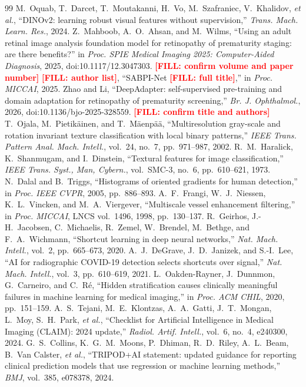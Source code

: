 \documentclass[journal]{IEEEtran}
\newcommand{\FILL}[1]{\textcolor{red}{\textbf{[FILL: #1]}}}
\begin{document}
\begin{thebibliography}{99}
 M.~Oquab, T.~Darcet, T.~Moutakanni, H.~Vo, M.~Szafraniec, V.~Khalidov, \emph{et al.}, ``DINOv2: learning robust visual features without supervision,'' \emph{Trans. Mach. Learn. Res.}, 2024.
 Z.~Mahboob, A.~O.~Ahsan, and M.~Wilms, ``Using an adult retinal image analysis foundation model for retinopathy of prematurity staging: are there benefits?'' in \emph{Proc. SPIE Medical Imaging 2025: Computer-Aided Diagnosis}, 2025, doi:10.1117/12.3047303. \FILL{confirm volume and paper number}
 \FILL{author list}, ``SABPI-Net \FILL{full title},'' in \emph{Proc. MICCAI}, 2025.
 Zhao and Li, ``DeepAdapter: self-supervised pre-training and domain adaptation for retinopathy of prematurity screening,'' \emph{Br. J. Ophthalmol.}, 2026, doi:10.1136/bjo-2025-328559. \FILL{confirm title and authors}
 T.~Ojala, M.~Pietik\"ainen, and T.~M\"aenp\"a\"a, ``Multiresolution gray-scale and rotation invariant texture classification with local binary patterns,'' \emph{IEEE Trans. Pattern Anal. Mach. Intell.}, vol.~24, no.~7, pp.~971--987, 2002.
 R.~M.~Haralick, K.~Shanmugam, and I.~Dinstein, ``Textural features for image classification,'' \emph{IEEE Trans. Syst., Man, Cybern.}, vol.~SMC-3, no.~6, pp.~610--621, 1973.
 N.~Dalal and B.~Triggs, ``Histograms of oriented gradients for human detection,'' in \emph{Proc. IEEE CVPR}, 2005, pp.~886--893.
 A.~F.~Frangi, W.~J.~Niessen, K.~L.~Vincken, and M.~A.~Viergever, ``Multiscale vessel enhancement filtering,'' in \emph{Proc. MICCAI}, LNCS vol.~1496, 1998, pp.~130--137.
 R.~Geirhos, J.-H.~Jacobsen, C.~Michaelis, R.~Zemel, W.~Brendel, M.~Bethge, and F.~A.~Wichmann, ``Shortcut learning in deep neural networks,'' \emph{Nat. Mach. Intell.}, vol.~2, pp.~665--673, 2020.
 A.~J.~DeGrave, J.~D.~Janizek, and S.-I.~Lee, ``AI for radiographic COVID-19 detection selects shortcuts over signal,'' \emph{Nat. Mach. Intell.}, vol.~3, pp.~610--619, 2021.
 L.~Oakden-Rayner, J.~Dunnmon, G.~Carneiro, and C.~R\'e, ``Hidden stratification causes clinically meaningful failures in machine learning for medical imaging,'' in \emph{Proc. ACM CHIL}, 2020, pp.~151--159.
 A.~S.~Tejani, M.~E.~Klontzas, A.~A.~Gatti, J.~T.~Mongan, L.~Moy, S.~H.~Park, \emph{et al.}, ``Checklist for Artificial Intelligence in Medical Imaging (CLAIM): 2024 update,'' \emph{Radiol. Artif. Intell.}, vol.~6, no.~4, e240300, 2024.
 G.~S.~Collins, K.~G.~M.~Moons, P.~Dhiman, R.~D.~Riley, A.~L.~Beam, B.~Van Calster, \emph{et al.}, ``TRIPOD+AI statement: updated guidance for reporting clinical prediction models that use regression or machine learning methods,'' \emph{BMJ}, vol.~385, e078378, 2024.

\end{thebibliography}
\end{document}
